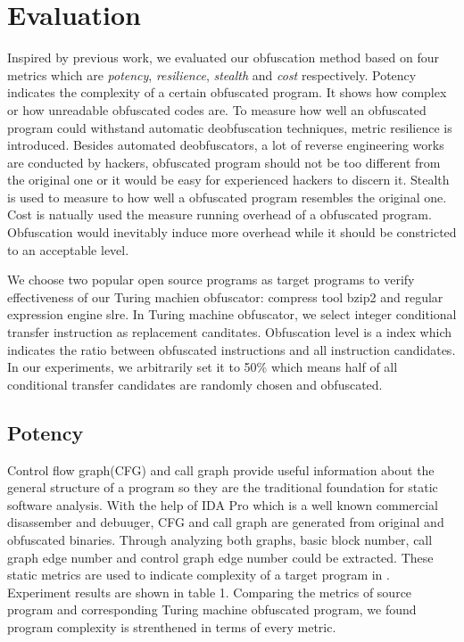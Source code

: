 \documentclass[lnicst]{svmultln}
\begin{document}
\section{Evaluation}
Inspired by previous work\cite{Collberg}, we evaluated our obfuscation method based on four metrics which are \textit{potency}, \textit{resilience}, \textit{stealth} and \textit{cost} respectively. Potency indicates the complexity of a certain obfuscated program. It shows how complex or how unreadable obfuscated codes are. To measure how well an obfuscated program could withstand automatic deobfuscation techniques, metric resilience is introduced. Besides automated deobfuscators, a lot of reverse engineering works are conducted by hackers, obfuscated program should not be too different from the original one or it would be easy for experienced hackers to discern it. Stealth is used to measure to how well a obfuscated program resembles the original one. Cost is natually used the measure running overhead of a obfuscated program. Obfuscation would inevitably induce more overhead while it should be constricted to an acceptable level.

We choose two popular open source programs as target programs to verify effectiveness of our Turing machien obfuscator: compress tool bzip2\cite{bzip2} and regular expression engine slre\cite{slre}. In Turing machine obfuscator, we select integer conditional transfer instruction as replacement canditates. Obfuscation level is a index which indicates the ratio between obfuscated instructions and all instruction candidates. In our experiments, we arbitrarily set it to 50\% which means half of all conditional transfer candidates are randomly chosen and obfuscated.
\subsection{Potency}
%
Control flow graph(CFG) and call  graph provide useful information about the general structure of a program so they are the traditional foundation for static software analysis. With the help of IDA Pro\cite{ida} which is a well known commercial disassember and debuuger, CFG and call graph are generated from original and obfuscated binaries. Through analyzing both graphs, basic block number, call graph edge number and control graph edge number could be extracted. These static metrics are used to indicate complexity of a target program in \cite{Chen}. Experiment results are shown in table 1. Comparing the metrics of source program and corresponding Turing machine obfuscated program, we found program complexity is strenthened in terms of every metric.
\end{document}
